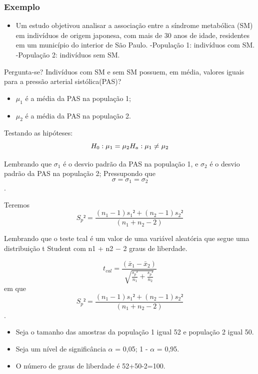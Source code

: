 \documentclass[]{article}
\providecommand{\tightlist}{%
  \setlength{\itemsep}{0pt}\setlength{\parskip}{0pt}}
\begin{document}
\hypertarget{exemplo}{%
\subsubsection{Exemplo}\label{exemplo}}

\begin{itemize}
\tightlist
\item
  Um estudo objetivou analisar a associação entre a síndrome metabólica
  (SM) em indivíduos de origem japonesa, com mais de 30 anos de idade,
  residentes em um município do interior de São Paulo. -População 1:
  indivíduos com SM. -População 2: indivíduos sem SM.
\end{itemize}

Pergunta-se? Indivíduos com SM e sem SM possuem, em média, valores
iguais para a pressão arterial sistólica(PAS)?

\begin{itemize}
\tightlist
\item
  \(\mu_1\) é a média da PAS na população 1;
\item
  \(\mu_2\) é a média da PAS na população 2.
\end{itemize}

Testando as hipóteses: \[H_0: \mu_1 = \mu_2
\\H_a: \mu_1 \neq \mu_2\]

Lembrando que \(\sigma_1\) é o desvio padrão da PAS na população 1, e
\(\sigma_2\) é o desvio padrão da PAS na população 2; Pressupondo que
\[\sigma = \sigma_1 = \sigma_2\].

Teremos \[S_p² = \frac{(n_1 - 1)s_1² + (n_2 - 1)s_2²}{(n_1 + n_2 - 2)}\]

Lembrando que o teste tcal é um valor de uma variável aleatória que
segue uma distribuição t Student com n1 + n2 − 2 graus de liberdade.

\[t_{cal} = \frac{(\bar{x}_1 - \bar{x}_2)}{\sqrt{\frac{s_p²}{n_1} + \frac{s_p²}{n_2}}}\]
em que \[S_p² = \frac{(n_1 - 1)s_1² + (n_2 - 1)s_2²}{(n_1 + n_2 - 2)}\].

\begin{itemize}
\tightlist
\item
  Seja o tamanho das amostras da população 1 igual 52 e população 2
  igual 50.
\item
  Seja um nível de significância \(\alpha\) = 0,05; 1 - \(\alpha\) =
  0,95.
\item
  O número de graus de liberdade é 52+50-2=100.
\end{itemize}
\end{document}
